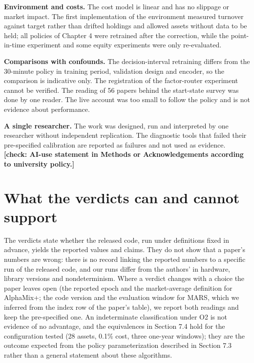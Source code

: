 \documentclass[12pt,a4paper]{report}
\begin{document}
\textbf{Environment and costs.} The cost model is linear and has no
slippage or market impact. The first implementation of the environment
measured turnover against target rather than drifted holdings and
allowed assets without data to be held; all policies of Chapter 4 were
retrained after the correction, while the point-in-time experiment and
some equity experiments were only re-evaluated.

\textbf{Comparisons with confounds.} The decision-interval retraining
differs from the 30-minute policy in training period, validation design
and encoder, so the comparison is indicative only. The registration of
the factor-router experiment cannot be verified. The reading of 56
papers behind the start-state survey was done by one reader. The live
account was too small to follow the policy and is not evidence about
performance.

\textbf{A single researcher.} The work was designed, run and interpreted
by one researcher without independent replication. The diagnostic tools
that failed their pre-specified calibration are reported as failures and
not used as evidence. \textbf{{[}check: AI-use statement in Methods or
Acknowledgements according to university policy.{]}}

\section{What the verdicts can and cannot
support}\label{what-the-verdicts-can-and-cannot-support}

The verdicts state whether the released code, run under definitions
fixed in advance, yields the reported values and claims. They do not
show that a paper's numbers are wrong: there is no record linking the
reported numbers to a specific run of the released code, and our runs
differ from the authors' in hardware, library versions and
nondeterminism. Where a verdict changes with a choice the paper leaves
open (the reported epoch and the market-average definition for
AlphaMix+; the code version and the evaluation window for MARS, which we
inferred from the index row of the paper's table), we report both
readings and keep the pre-specified one. An indeterminate classification
under O2 is not evidence of no advantage, and the equivalences in
Section 7.4 hold for the configuration tested (28 assets, 0.1\% cost,
three one-year windows); they are the outcome expected from the policy
parameterization described in Section 7.3 rather than a general
statement about these algorithms.
\end{document}

